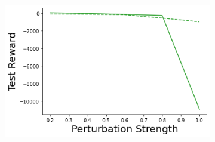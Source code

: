\begin{figure}
\begin{subfigure}{.24\textwidth}
    \end{subfigure}
    \begin{subfigure}{.24\textwidth}
        \includegraphics[width=\textwidth]{sections/011_icml2022/resources/transition_shift-PostNet-LunarLanderShift-v0-mean_reward_.png}
    \end{subfigure}
    

\end{figure}
